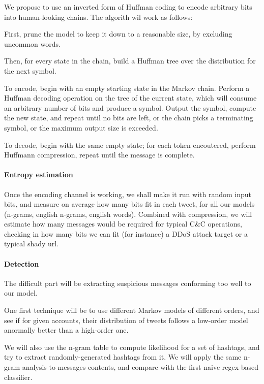 \documentclass[a4paper,11pt]{article}
\begin{document}
We propose to use an inverted form of Huffman coding to encode arbitrary bits into human-looking chains. The algorith wil work as follows:

First, prune the model to keep it down to a reasonable size, by excluding uncommon words.

Then, for every state in the chain, build a Huffman tree over the distribution for the next symbol.

To encode, begin with an empty starting state in the Markov chain. Perform a Huffman decoding operation on the tree of the current state, which will consume an arbitrary number of bits and produce a symbol. Output the symbol, compute the new state, and repeat until no bits are left, or the chain picks a terminating symbol, or the maximum output size is exceeded.

To decode, begin with the same empty state; for each token encoutered, perform Huffmann compression, repeat until the message is complete.

\paragraph{Entropy estimation}

Once the encoding channel is working, we shall make it run with random input bits, and measure on average how many bits fit in each tweet, for all our models (n-grams, english n-grams, english words). Combined with compression, we will estimate how many messages would be required for typical C\&C operations, checking in how many bits we can fit (for instance) a DDoS attack target or a typical shady url.

\paragraph{Detection}

The difficult part will be extracting suspicious messages conforming too well to our model. 

One first technique will be to use different Markov models of different orders, and see if for given accounts, their distribution of tweets follows a low-order model anormally better than a high-order one.

We will also use the n-gram table to compute likelihood for a set of hashtags, and try to extract randomly-generated hashtags from it. We will apply the same n-gram analysis to messages contents, and compare with the first naive regex-based classifier.
\end{document}
